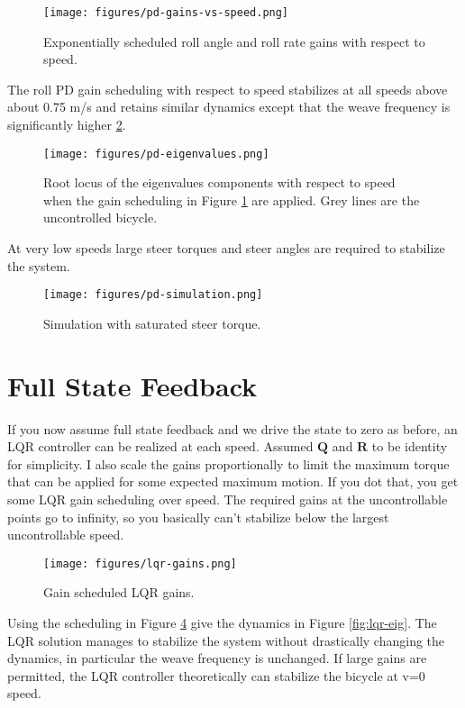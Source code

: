 \documentclass[12pt]{article}
\begin{document}
\begin{figure}
  \centering
  \texttt{[image: figures/pd-gains-vs-speed.png]}
  \caption{Exponentially scheduled roll angle and roll rate gains with respect
  to speed.}
  \label{fig:pd-gains-vs-speed}
\end{figure}

The roll PD gain scheduling with respect to speed stabilizes at all speeds
above about 0.75 m/s and retains similar dynamics except that the weave
frequency is significantly higher \ref{fig:pd-eigenvalues}.

\begin{figure}
  \centering
  \texttt{[image: figures/pd-eigenvalues.png]}
  \caption{Root locus of the eigenvalues components with respect to speed when
  the gain scheduling in Figure \ref{fig:pd-gains-vs-speed} are applied. Grey
  lines are the uncontrolled bicycle.}
  \label{fig:pd-eigenvalues}
\end{figure}

At very low speeds large steer torques and steer angles are required to
stabilize the system.

\begin{figure}
  \centering
  \texttt{[image: figures/pd-simulation.png]}
  \caption{Simulation with saturated steer torque.}
  \label{fig:pd_simulation}
\end{figure}

\section{Full State Feedback}

If you now assume full state feedback and we drive the state to zero as before,
an LQR controller can be realized at each speed. Assumed \(\mathbf{Q}\) and
\(\mathbf{R}\) to be identity for simplicity. I also scale the gains
proportionally to limit the maximum torque that can be applied for some
expected maximum motion. If you dot that, you get some LQR gain scheduling over
speed.  The required gains at the uncontrollable points go to infinity, so you
basically can't stabilize below the largest uncontrollable speed.

\begin{figure}
  \centering
  \texttt{[image: figures/lqr-gains.png]}
  \caption{Gain scheduled LQR gains.}
  \label{fig:lqr-gains}
\end{figure}

Using the scheduling in Figure \ref{fig:lqr-gains} give the dynamics in Figure
\ref{fig:lqr-eig}. The LQR solution manages to stabilize the system without
drastically changing the dynamics, in particular the weave frequency is
unchanged. If large gains are permitted, the LQR controller theoretically can
stabilize the bicycle at v=0 speed.
\end{document}

